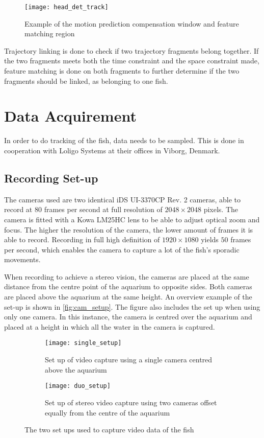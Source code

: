 \begin{figure}[H]
	\centering
	\texttt{[image: head\_det\_track]}
	\caption{Example of the motion prediction compensation window and feature matching region \citep{Qian2014}}
	\label{fig:head_det_track}
\end{figure}

Trajectory linking is done to check if two trajectory fragments belong together. If the two fragments meets both the time constraint and the space constraint made, feature matching is done on both fragments to further determine if the two fragments should be linked, as belonging to one fish.

\section{Data Acquirement}
In order to do tracking of the fish, data needs to be sampled. This is done in cooperation with Loligo Systems at their offices in Viborg, Denmark.

\subsection{Recording Set-up}
The cameras used are two identical iDS UI-3370CP Rev. 2 cameras, able to record at $80$ frames per second at full resolution of $ 2048\times2048 $ pixels. The camera is fitted with a Kowa LM25HC lens to be able to adjust optical zoom and focus. The higher the resolution of the camera, the lower amount of frames it is able to record. Recording in full high definition of $1920 \times 1080$ yields $50$ frames per second, which enables the camera to capture a lot of the fish's sporadic movements.

When recording to achieve a stereo vision, the cameras are placed at the same distance from the centre point of the aquarium to opposite sides. Both cameras are placed above the aquarium at the same height. An overview example of the set-up is shown in \autoref{fig:cam_setup}. The figure also includes the set up when using only one camera. In this instance, the camera is centred over the aquarium and placed at a height in which all the water in the camera is captured. 

\begin{figure}
	\centering
	\begin{subfigure}{0.4\textwidth}
		\texttt{[image: single\_setup]}
		\caption{Set up of video capture using a single camera centred above the aquarium}
		\label{fig:single_setup}
	\end{subfigure}
	\begin{subfigure}{0.4\textwidth}
		\texttt{[image: duo\_setup]}
		\caption{Set up of stereo video capture using two cameras offset equally from the centre of the aquarium}
		\label{fig:duo_setup}
	\end{subfigure}
\caption{The two set ups used to capture video data of the fish}
\label{fig:cam_setup}
\end{figure}
